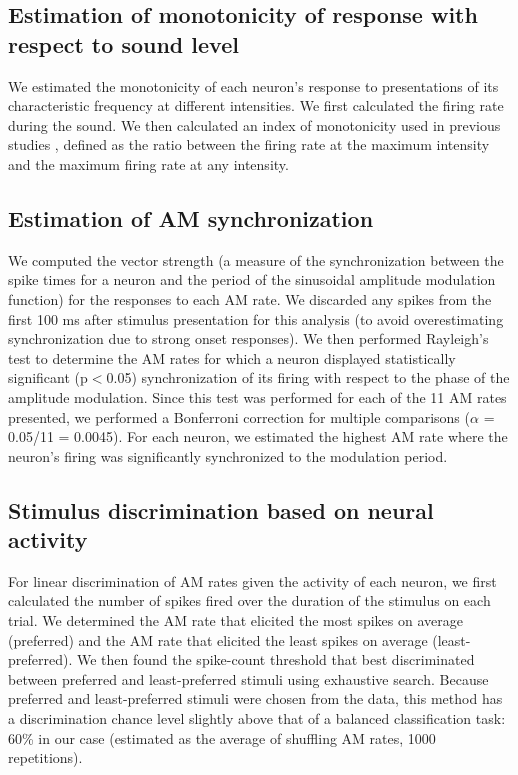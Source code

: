 \subsection{Estimation of monotonicity of response with respect to sound level}

We estimated the monotonicity of each neuron's response to presentations of its characteristic frequency at different intensities. We first calculated the firing rate during the sound. We then calculated an index of monotonicity used in previous studies \citep{DelaRocha2008, Watkins2011}, defined as the ratio between the firing rate at the maximum intensity and the maximum firing rate at any intensity.

\subsection{Estimation of AM synchronization}
We computed the vector strength (a measure of the synchronization between the spike times for a neuron and the period of the sinusoidal amplitude modulation function) for the responses to each AM rate.
%
We discarded any spikes from the first 100 ms after stimulus presentation for this analysis (to avoid overestimating synchronization due to strong onset responses).
%
We then performed Rayleigh’s test to determine the AM rates for which a neuron displayed statistically significant (p$<$0.05) synchronization of its firing with respect to the phase of the amplitude modulation. 
%
Since this test was performed for each of the 11 AM rates presented, we performed a Bonferroni correction for multiple comparisons ($\alpha$ = 0.05/11 = 0.0045).
%
For each neuron, we estimated the highest AM rate where the neuron’s firing was significantly synchronized to the modulation period. 

\subsection{Stimulus discrimination based on neural activity}
For linear discrimination of AM rates given the activity of each neuron, we first calculated the number of spikes fired over the duration of the stimulus on each trial.
%
We determined the AM rate that elicited the most spikes on average (preferred) and the AM rate that elicited the least spikes on average (least-preferred).
%
We then found the spike-count threshold that best discriminated between preferred and least-preferred stimuli using exhaustive search.  
%
Because preferred and least-preferred stimuli were chosen from the data, this method has a discrimination chance level slightly above that of a balanced classification task: 60\% in our case (estimated as the average of shuffling AM rates, 1000 repetitions).

